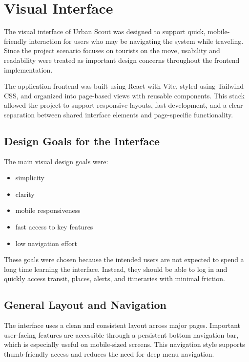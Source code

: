 
\section{Visual Interface}

The visual interface of Urban Scout was designed to support quick, mobile-friendly interaction for users who may be navigating the system while traveling. Since the project scenario focuses on tourists on the move, usability and readability were treated as important design concerns throughout the frontend implementation.

The application frontend was built using React with Vite, styled using Tailwind CSS, and organized into page-based views with reusable components. This stack allowed the project to support responsive layouts, fast development, and a clear separation between shared interface elements and page-specific functionality.

\subsection{Design Goals for the Interface}

The main visual design goals were:
\begin{itemize}
    \item simplicity
    \item clarity
    \item mobile responsiveness
    \item fast access to key features
    \item low navigation effort
\end{itemize}

These goals were chosen because the intended users are not expected to spend a long time learning the interface. Instead, they should be able to log in and quickly access transit, places, alerts, and itineraries with minimal friction.

\subsection{General Layout and Navigation}

The interface uses a clean and consistent layout across major pages. Important user-facing features are accessible through a persistent bottom navigation bar, which is especially useful on mobile-sized screens. This navigation style supports thumb-friendly access and reduces the need for deep menu navigation.

